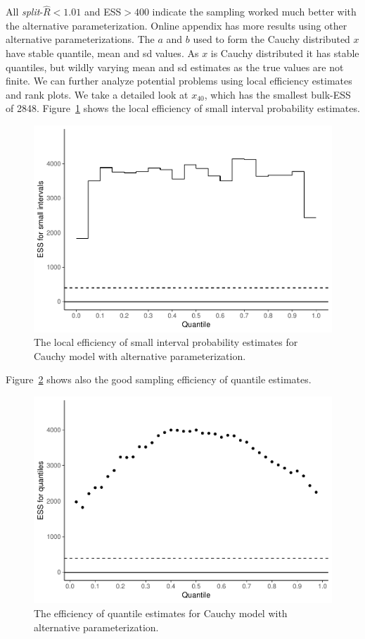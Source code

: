 \documentclass[american,]{article}
\begin{document}

All \emph{split}-\(\widehat{R}<1.01\) and ESS\(>400\) indicate the
sampling worked much better with the alternative parameterization.
Online appendix has more results using other
alternative parameterizations. The \(a\) and \(b\) used
to form the Cauchy distributed \(x\) have stable quantile, mean and
sd values. As \(x\) is Cauchy distributed it has stable
quantiles, but wildly varying mean and sd estimates as the true values
are not finite.
%
We can further analyze potential problems using local efficiency
estimates and rank plots. We take a detailed look at \(x_{40}\), which
has the smallest bulk-ESS of 2848.
%
Figure~\ref{fig:local-ess-fit-alt1-1} shows
the local efficiency of small interval probability estimates.
\begin{figure}[tp]
  \centering
  \includegraphics[width=0.6\linewidth]{graphics/local-ess-fit-alt1-1.pdf}
  \caption{The local efficiency of small interval probability estimates for Cauchy model with alternative parameterization.}
\label{fig:local-ess-fit-alt1-1}
\end{figure}
Figure~\ref{fig:quantile-ess-alt1-1} shows also the good sampling efficiency
of quantile estimates.
\begin{figure}[tp]
  \centering
  \includegraphics[width=0.6\linewidth]{graphics/quantile-ess-fit-alt1-1.pdf}
  \caption{The efficiency of quantile estimates for Cauchy model with alternative parameterization.}
  \label{fig:quantile-ess-alt1-1}
\end{figure}
\end{document}
